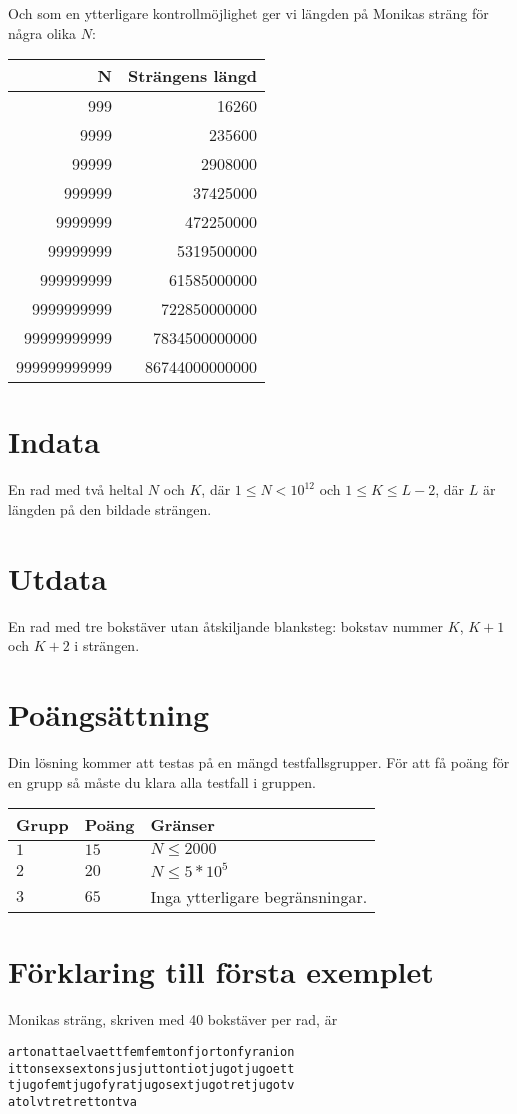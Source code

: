 Och som en ytterligare kontrollmöjlighet ger vi längden på Monikas sträng för några olika $N$:

\begin{tabular}{|r|r|}\hline
{\bf N} & {\bf Strängens längd} \\ \hline
999 & 16260 \\
9999 & 235600 \\
99999 & 2908000 \\
999999 & 37425000 \\
9999999   & 472250000 \\
99999999 & 5319500000\\
999999999 & 61585000000\\
9999999999 & 722850000000 \\
99999999999 &	7834500000000 \\
999999999999 &86744000000000 \\ \hline
\end{tabular}


\section*{Indata}
En rad med två heltal $N$ och $K$, där $1 \leq N < 10^12$ och $1 \leq K \leq L-2$, där $L$ är längden på den bildade strängen.

\section*{Utdata}
En rad med tre bokstäver utan åtskiljande blanksteg: bokstav nummer $K$, $K+1$ och $K+2$ i strängen. 

\section*{Poängsättning}
Din lösning kommer att testas på en mängd testfallsgrupper.
För att få poäng för en grupp så måste du klara alla testfall i gruppen.

\noindent
\begin{tabular}{| l | l | p{12cm} |}
  \hline
  \textbf{Grupp} & \textbf{Poäng} & \textbf{Gränser} \\ \hline
  $1$   & $15$       & $N \leq 2000 $\\ \hline
  $2$   & $20$       & $N \leq 5*10^5 $\\ \hline
  $3$   & $65$       & Inga ytterligare begränsningar. \\ \hline
\end{tabular}

\section*{Förklaring till första exemplet}

Monikas sträng, skriven med 40 bokstäver per rad, är

\begin{verbatim}
artonattaelvaettfemfemtonfjortonfyranion
ittonsexsextonsjusjuttontiotjugotjugoett
tjugofemtjugofyratjugosextjugotretjugotv
atolvtretrettontva
\end{verbatim}
